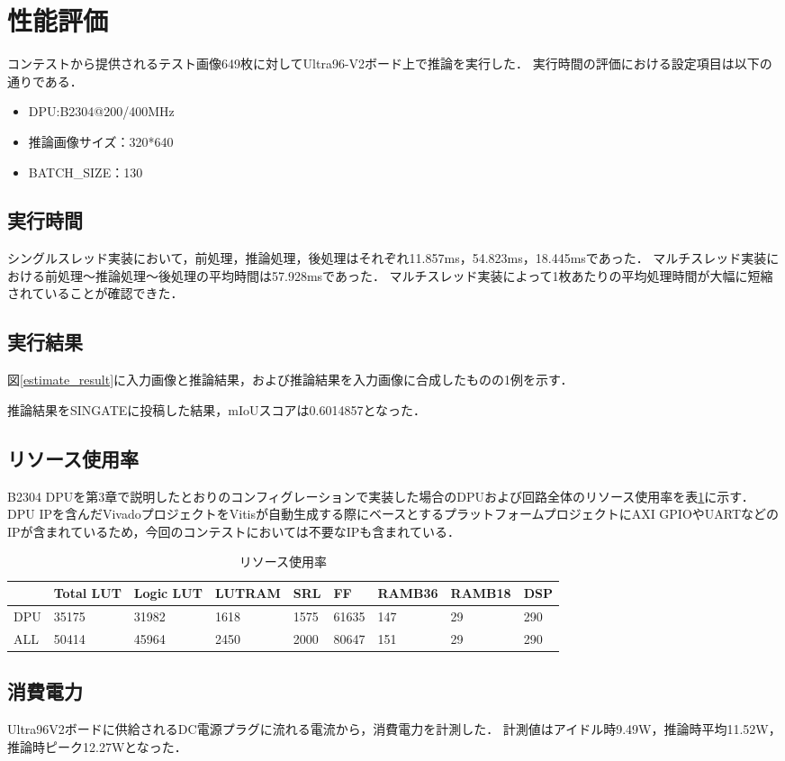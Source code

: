 \section{性能評価}
コンテストから提供されるテスト画像649枚に対してUltra96-V2ボード上で推論を実行した．
実行時間の評価における設定項目は以下の通りである．
\begin{itemize}
    \item{DPU:B2304@200/400MHz}
    \item{推論画像サイズ：320*640}
    \item{BATCH\_SIZE：130}
\end{itemize}
\subsection{実行時間}
シングルスレッド実装において，前処理，推論処理，後処理はそれぞれ11.857ms，54.823ms，18.445msであった．
マルチスレッド実装における前処理〜推論処理〜後処理の平均時間は57.928msであった．
マルチスレッド実装によって1枚あたりの平均処理時間が大幅に短縮されていることが確認できた．

\subsection{実行結果}
図\ref{estimate_result}に入力画像と推論結果，および推論結果を入力画像に合成したものの1例を示す．

推論結果をSINGATEに投稿した結果，mIoUスコアは0.6014857となった．

\subsection{リソース使用率}
B2304 DPUを第3章で説明したとおりのコンフィグレーションで実装した場合のDPUおよび回路全体のリソース使用率を表\ref{resource_util}に示す．
DPU IPを含んだVivadoプロジェクトをVitisが自動生成する際にベースとするプラットフォームプロジェクトにAXI GPIOやUARTなどのIPが含まれているため，今回のコンテストにおいては不要なIPも含まれている．

\begin{table}[b]
    \begin{center}
        \label{resource_util}
        \caption{リソース使用率}
        \begin{tabular}{lllllllll}
            & Total LUT & Logic LUT & LUTRAM & SRL  & FF    & RAMB36 & RAMB18 & DSP \\ \hline
        DPU & 35175     & 31982     & 1618   & 1575 & 61635 & 147    & 29     & 290 \\ \hline
        ALL & 50414     & 45964     & 2450   & 2000 & 80647 & 151    & 29     & 290
        \end{tabular}
    \end{center}
\end{table}
\subsection{消費電力}
Ultra96V2ボードに供給されるDC電源プラグに流れる電流から，消費電力を計測した．
計測値はアイドル時9.49W，推論時平均11.52W，推論時ピーク12.27Wとなった．